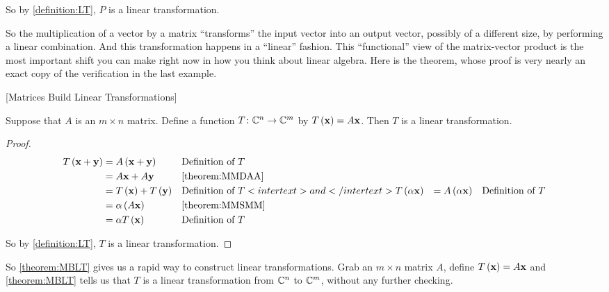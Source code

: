 \documentclass{ximera}
\begin{document}
\begin{example}
So by \ref{definition:LT}, $P$ is a linear transformation.



\end{example}

So the multiplication of a vector by a matrix ``transforms'' the input vector into an output vector, possibly of a different size, by performing a linear combination.  And this transformation happens in a ``linear'' fashion.  This ``functional'' view of the matrix-vector product is the most important shift you can make right now in how you think about linear algebra.  Here is the theorem, whose proof is very nearly an exact copy of the verification in the last example.



\begin{theorem}
\label{theorem:MBLT}
[Matrices Build Linear Transformations]

Suppose that $A$ is an $m\times n$ matrix.  Define a function $T\colon \mathbb{C}^{n}\rightarrow\mathbb{C}^{m}$ by $T\left(\mathbf{x}\right)=A\mathbf{x}$.  Then $T$ is a linear transformation.





\begin{proof}

\begin{align*}
T\left(\mathbf{x}+\mathbf{y}\right)
&=A\left(\mathbf{x}+\mathbf{y}\right)&&\text{Definition of $T$}\\
&=A\mathbf{x}+A\mathbf{y}&&\ref{theorem:MMDAA}\\
&=T\left(\mathbf{x}\right)+T\left(\mathbf{y}\right)&&\text{Definition of $T$}
<intertext>and</intertext>
T\left(\alpha\mathbf{x}\right)
&=A\left(\alpha\mathbf{x}\right)&&\text{Definition of $T$}\\
&=\alpha\left(A\mathbf{x}\right)&&\ref{theorem:MMSMM}\\
&=\alpha T\left(\mathbf{x}\right)&&\text{Definition of $T$}
\end{align*}




So by \ref{definition:LT}, $T$ is a linear transformation.



\end{proof}
\end{theorem}

So \ref{theorem:MBLT} gives us a rapid way to construct linear transformations.  Grab an $m\times n$ matrix $A$, define $T\left(\mathbf{x}\right)=A\mathbf{x}$ and \ref{theorem:MBLT} tells us that $T$ is a linear transformation from $\mathbb{C}^{n}$ to $\mathbb{C}^{m}$, without any further checking.
\end{document}
